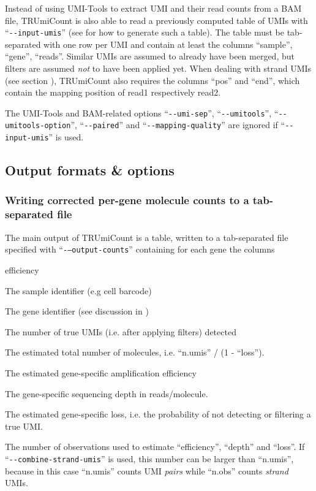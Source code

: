\documentclass[a4paper]{scrartcl}
\makeatletter
\let\subsection@phlo\subsection
\renewcommand\subsection{\needspace{5\baselineskip}\subsection@phlo}
\newcommand{\ddarg}[1]{\texttt{-{}-#1}}
\DeclareRobustCommand*{\nameref}[1]{%
      \textit{\my@nameref{#1}}%
    }%
\makeatother
\begin{document}
Instead of using UMI-Tools to extract UMI and their read counts from a BAM file, TRUmiCount is also able to read a previously computed table of UMIs with ``\ddarg{input-umis}'' (see \nameref{output-options} for how to generate such a table). The table must be tab-separated with one row per UMI and contain at least the columns ``sample'', ``gene'', ``reads''. Similar UMIs are assumed to already have been merged, but filters are assumed \emph{not} to have been applied yet. When dealing with strand UMIs (see section \nameref{strand-umis}), TRUmiCount also requires the columns ``pos'' and ``end'', which contain the mapping position of read1 respectively read2.

The UMI-Tools and BAM-related options ``\ddarg{umi-sep}'', ``\ddarg{umitools}'', ``\ddarg{umitools-option}'', ``\ddarg{paired}'' and ``\ddarg{mapping-quality}'' are ignored if ``\ddarg{input-umis}'' is used.

\subsection{Output formats \& options}\label{output-options}

\subsubsection*{Writing corrected per-gene molecule counts to a tab-separated file}

The main output of TRUmiCount is a table, written to a tab-separated file specified with ``\ddarg{--output-counts}'' containing for each gene the columns
\begin{labeling}[:]{efficiency\ }
\item[sample] The sample identifier (e.g cell barcode)
\item[gene] The gene identifier (see discussion in \nameref{input-bam})
\item[n.umis] The number of true UMIs (i.e. after applying filters) detected
\item[n.tot] The estimated total number of molecules, i.e. ``n.umis'' / (1 - ``loss'').
\item[efficiency] The estimated gene-specific amplification efficiency
\item[depth] The gene-specific sequencing depth in reads/molecule.
\item[loss] The estimated gene-specific loss, i.e. the probability of not detecting or filtering a true UMI.
\item[n.obs] The number of observations used to estimate ``efficiency'', ``depth'' and ``loss''. If ``\ddarg{combine-strand-umis}'' is used, this number can be larger than ``n.umis'', because in this case ``n.umis'' counts UMI \emph{pairs} while ``n.obs'' counts \emph{strand} UMIs.
\end{labeling}
\end{document}
